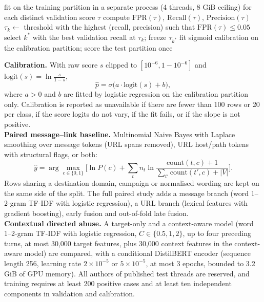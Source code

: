 \begin{algorithm}[!htbp]
\caption{Model selection under a false-positive budget}\label{alg:thresh}
\begin{algorithmic}[1]
  \State fit on the training partition in a separate process (4 threads, 8 GiB ceiling)
  \State for each distinct validation score $\tau$ compute $\mathrm{FPR}(\tau)$, $\mathrm{Recall}(\tau)$, $\mathrm{Precision}(\tau)$
  \State $\tau_k \gets$ threshold with the highest (recall, precision) such that $\mathrm{FPR}(\tau)\le 0.05$
\EndFor
\State select $k^\ast$ with the best validation recall at $\tau_k$; freeze $\tau_{k^\ast}$
\State fit sigmoid calibration on the calibration partition; score the test partition once
\end{algorithmic}
\end{algorithm}

\noindent\textbf{Calibration.} With raw score $s$ clipped to $[10^{-6},1-10^{-6}]$ and $\mathrm{logit}(s)=\ln\frac{s}{1-s}$,
\begin{equation}
\hat p = \sigma\big(a\cdot\mathrm{logit}(s)+b\big),
\end{equation}
where $a>0$ and $b$ are fitted by logistic regression on the calibration partition only. Calibration is reported as unavailable if there are fewer than 100 rows or 20 per class, if the score logits do not vary, if the fit fails, or if the slope is not positive.\\

\noindent\textbf{Paired message--link baseline.} Multinomial Naive Bayes with Laplace smoothing over message tokens (URL spans removed), URL host/path tokens with structural flags, or both:
\begin{equation}
\hat y = \arg\max_{c\in\{0,1\}}\Big[\ln P(c)+\sum_{t} n_t \ln\frac{\mathrm{count}(t,c)+1}{\sum_{t'}\mathrm{count}(t',c)+|V|}\Big].
\end{equation}
Rows sharing a destination domain, campaign or normalised wording are kept on the same side of the split. The full paired study adds a message branch (word 1--2-gram TF-IDF with logistic regression), a URL branch (lexical features with gradient boosting), early fusion and out-of-fold late fusion.\\

\noindent\textbf{Contextual directed abuse.} A target-only and a context-aware model (word 1--2-gram TF-IDF with logistic regression, $C\in\{0.5,1,2\}$, up to four preceding turns, at most 30,000 target features, plus 30,000 context features in the context-aware model) are compared, with a conditional DistilBERT encoder (sequence length 256, learning rate $2\times10^{-5}$ or $5\times10^{-5}$, at most 3 epochs, bounded to 3.2 GiB of GPU memory). All authors of published test threads are reserved, and training requires at least 200 positive cases and at least ten independent components in validation and calibration.


